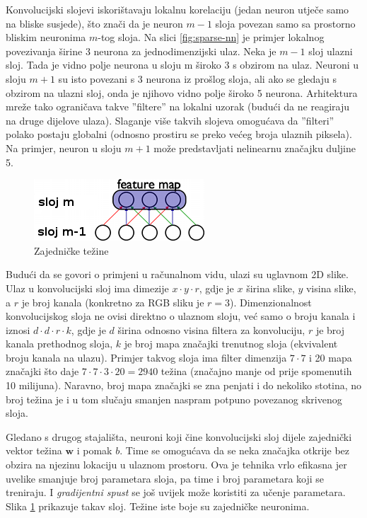 \documentclass[times, utf8, diplomski, numeric]{fer}
\begin{document}
Konvolucijski slojevi iskorištavaju lokalnu korelaciju (jedan neuron utječe samo na bliske susjede), što znači da je neuron $m-1$ sloja povezan samo sa prostorno bliskim neuronima $m$-tog sloja. Na slici \ref{fig:sparse-nn} je primjer lokalnog povezivanja širine 3 neurona za jednodimenzijski ulaz.
Neka je $m-1$ sloj ulazni sloj. Tada je vidno polje neurona u sloju m široko 3 s obzirom na ulaz. Neuroni u sloju $m+1$ su isto povezani s 3 neurona iz prošlog sloja, ali ako se gledaju s obzirom na ulazni sloj, onda je njihovo vidno polje široko 5 neurona. Arhitektura mreže tako ograničava takve ''filtere'' na lokalni uzorak (budući da ne reagiraju na druge dijelove ulaza). Slaganje više takvih slojeva omogućava da ''filteri'' polako postaju globalni (odnosno prostiru se preko većeg broja ulaznih piksela). Na primjer, neuron u sloju $m+1$ može predstavljati  nelinearnu značajku duljine 5.

\begin{figure}[htb]
\centering
\includegraphics{imgs/conv_1D_nn.png}
\caption{Zajedničke težine}
\label{fig:conv-nn}
\end{figure}

Budući da se govori o primjeni u računalnom vidu, ulazi su uglavnom 2D slike.
Ulaz u konvolucijski sloj ima dimezije $x \cdot y \cdot r$, gdje je $x$ širina slike, $y$ visina slike, a $r$ je broj kanala (konkretno za RGB sliku je $r = 3$). Dimenzionalnost konvolucijskog sloja ne ovisi direktno o ulaznom sloju, već samo o broju kanala i iznosi $d \cdot d \cdot r \cdot k$, gdje je $d$ širina odnosno visina filtera za konvoluciju, $r$ je broj kanala prethodnog sloja, $k$ je broj mapa značajki trenutnog sloja (ekvivalent broju kanala na ulazu). Primjer takvog sloja ima filter dimenzija $7 \cdot 7$ i 20 mapa značajki što daje $7 \cdot 7 \cdot 3 \cdot 20 = 2940$ težina (značajno manje od prije spomenutih 10 milijuna). Naravno, broj mapa značajki se zna penjati i do nekoliko stotina, no broj težina je i u tom slučaju smanjen naspram potpuno povezanog skrivenog sloja.

Gledano s drugog stajališta, neuroni koji čine konvolucijski sloj dijele zajednički vektor težina $\boldsymbol{w}$ i pomak $b$. Time se omogućava da se neka značajka otkrije bez obzira na njezinu lokaciju u ulaznom prostoru. Ova je tehnika vrlo efikasna jer uvelike smanjuje broj parametara sloja, pa time i broj parametara koji se treniraju. I \emph{gradijentni spust} se još uvijek može koristiti za učenje parametara. Slika \ref{fig:conv-nn} prikazuje takav sloj. Težine iste boje su zajedničke neuronima.
\end{document}
